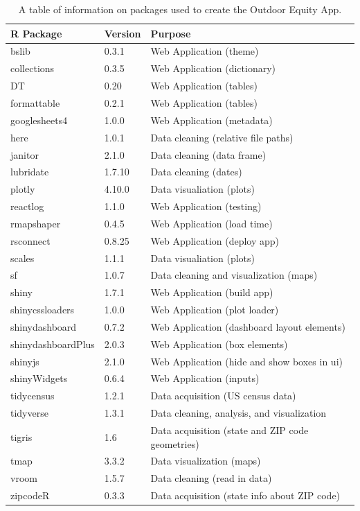 \documentclass[
  11 pt,
  openany]{book}
\begin{document}
\begin{table}

\caption{\label{tab:packages-tab}A table of information on packages used to create the Outdoor Equity App.}
\begin{tabular}[t]{l|l|l}
\hline
R Package & Version & Purpose\\
\hline
bslib & 0.3.1 & Web Application (theme)\\
\hline
collections & 0.3.5 & Web Application (dictionary)\\
\hline
DT & 0.20 & Web Application (tables)\\
\hline
formattable & 0.2.1 & Web Application (tables)\\
\hline
googlesheets4 & 1.0.0 & Web Application (metadata)\\
\hline
here & 1.0.1 & Data cleaning (relative file paths)\\
\hline
janitor & 2.1.0 & Data cleaning (data frame)\\
\hline
lubridate & 1.7.10 & Data cleaning (dates)\\
\hline
plotly & 4.10.0 & Data visualiation (plots)\\
\hline
reactlog & 1.1.0 & Web Application (testing)\\
\hline
rmapshaper & 0.4.5 & Web Application (load time)\\
\hline
rsconnect & 0.8.25 & Web Application (deploy app)\\
\hline
scales & 1.1.1 & Data visualiation (plots)\\
\hline
sf & 1.0.7 & Data cleaning and visualization (maps)\\
\hline
shiny & 1.7.1 & Web Application (build app)\\
\hline
shinycssloaders & 1.0.0 & Web Application (plot loader)\\
\hline
shinydashboard & 0.7.2 & Web Application (dashboard layout elements)\\
\hline
shinydashboardPlus & 2.0.3 & Web Application (box elements)\\
\hline
shinyjs & 2.1.0 & Web Application (hide and show boxes in ui)\\
\hline
shinyWidgets & 0.6.4 & Web Application (inputs)\\
\hline
tidycensus & 1.2.1 & Data acquisition (US census data)\\
\hline
tidyverse & 1.3.1 & Data cleaning, analysis, and visualization\\
\hline
tigris & 1.6 & Data acquisition (state and ZIP code geometries)\\
\hline
tmap & 3.3.2 & Data visualization (maps)\\
\hline
vroom & 1.5.7 & Data cleaning (read in data)\\
\hline
zipcodeR & 0.3.3 & Data acquisition (state info about ZIP code)\\
\hline
\end{tabular}
\end{table}
\end{document}

